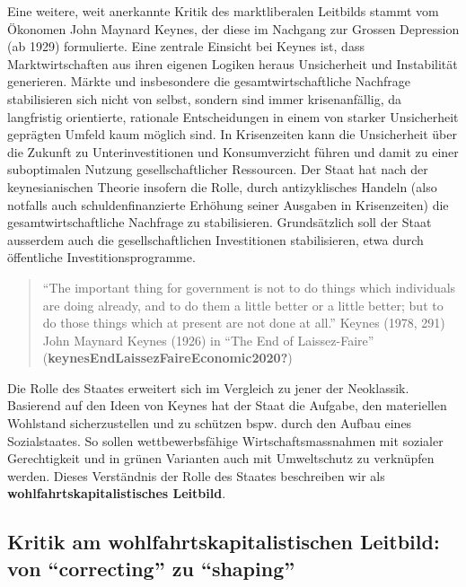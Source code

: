 \documentclass[
  nswissgerman,
  a4paper,
  DIV=11,
  numbers=noendperiod,
  oneside,
  openany]{scrreprt}
\begin{document}
Eine weitere, weit anerkannte Kritik des marktliberalen Leitbilds stammt
vom Ökonomen John Maynard Keynes, der diese im Nachgang zur Grossen
Depression (ab 1929) formulierte. Eine zentrale Einsicht bei Keynes ist,
dass Marktwirtschaften aus ihren eigenen Logiken heraus Unsicherheit und
Instabilität generieren. Märkte und insbesondere die
gesamtwirtschaftliche Nachfrage stabilisieren sich nicht von selbst,
sondern sind immer krisenanfällig, da langfristig orientierte, rationale
Entscheidungen in einem von starker Unsicherheit geprägten Umfeld kaum
möglich sind. In Krisenzeiten kann die Unsicherheit über die Zukunft zu
Unterinvestitionen und Konsumverzicht führen und damit zu einer
suboptimalen Nutzung gesellschaftlicher Ressourcen. Der Staat hat nach
der keynesianischen Theorie insofern die Rolle, durch antizyklisches
Handeln (also notfalls auch schuldenfinanzierte Erhöhung seiner Ausgaben
in Krisenzeiten) die gesamtwirtschaftliche Nachfrage zu stabilisieren.
Grundsätzlich soll der Staat ausserdem auch die gesellschaftlichen
Investitionen stabilisieren, etwa durch öffentliche
Investitionsprogramme.

\begin{quote}
``The important thing for government is not to do things which
individuals are doing already, and to do them a little better or a
little better; but to do those things which at present are not done at
all.'' Keynes (1978, 291) John Maynard Keynes (1926) in ``The End of
Laissez-Faire'' (\textbf{keynesEndLaissezFaireEconomic2020?})
\end{quote}

Die Rolle des Staates erweitert sich im Vergleich zu jener der
Neoklassik. Basierend auf den Ideen von Keynes hat der Staat die
Aufgabe, den materiellen Wohlstand sicherzustellen und zu schützen bspw.
durch den Aufbau eines Sozialstaates. So sollen wettbewerbsfähige
Wirtschaftsmassnahmen mit sozialer Gerechtigkeit und in grünen Varianten
auch mit Umweltschutz zu verknüpfen werden. Dieses Verständnis der Rolle
des Staates beschreiben wir als \textbf{wohlfahrtskapitalistisches
Leitbild}.

\subsection{Kritik am wohlfahrtskapitalistischen Leitbild: von
``correcting'' zu
``shaping''}\label{kritik-am-wohlfahrtskapitalistischen-leitbild-von-correcting-zu-shaping}
\end{document}
